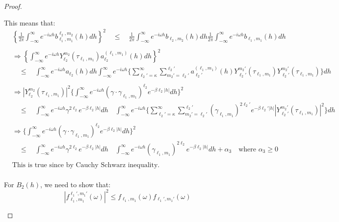 \documentclass[11pt]{article}
\begin{document}
\begin{itemize}
\begin{proof}
\begin{enumerate}
This means that:
\begin{align*}
&\left\{ \frac{1}{2\pi} \int_{-\infty}^\infty e^{-i\omega h} b_{\ell_1,m_1}^{\ell_2,m_2}(h) dh \right\}^2 \quad \le \quad \frac{1}{2\pi} \int_{-\infty}^\infty e^{-i\omega h} b_{\ell_2,m_2}(h) dh \frac{1}{2\pi} \int_{-\infty}^\infty e^{-i\omega h} b_{\ell_1,m_1}(h) dh \\
\\
&\Rightarrow \left\{ \int_{-\infty}^\infty e^{-i\omega h} Y_{\ell_2}^{m_2}(\tau_{\ell_1,m_1}) a_{\ell_2}^{(\ell_1,m_1)}(h) dh \right\}^2\\ 
&\quad \le \quad \int_{-\infty}^\infty e^{-i\omega h} a_{\ell_2}(h) dh \int_{-\infty}^\infty e^{-i\omega h} \biggl\{ \sum_{\ell_2'=\kappa}^{\infty} \sum_{m_2'=\ell_2'}^{\ell_2'} a_{\ell_2'}^{(\ell_1,m_1)}(h) Y_{\ell_2'}^{m_2'}(\tau_{\ell_1,m_1}) Y_{\ell_2'}^{m_2'}(\tau_{\ell_1,m_1}) \biggl\} dh\\
\\
&\Rightarrow |Y_{\ell_2}^{m_2}(\tau_{\ell_1,m_1})|^2 \biggl\{\int_{-\infty}^\infty e^{-i\omega h} (\gamma \cdot \gamma_{\ell_1,m_1})^{\ell_2} e^{-\beta \ell_2 |h|} dh \biggl\}^2\\
& \quad \le \quad \int_{-\infty}^\infty e^{-i\omega h} \gamma^{2\ell_2} e^{-\beta \ell_2 |h|}dh \quad \int_{-\infty}^\infty e^{-i\omega h} \biggl\{ \sum_{\ell_2'=\kappa}^{\infty} \sum_{m_2'=\ell_2'}^{\ell_2'} (\gamma_{\ell_1,m_1})^{2 \ell_2'} e^{-\beta \ell_2' |h|} |Y_{\ell_2'}^{m_2'}(\tau_{\ell_1,m_1})|^2\biggl\} dh\\
\\
&\Rightarrow \biggl\{\int_{-\infty}^\infty e^{-i\omega h} (\gamma \cdot \gamma_{\ell_1,m_1})^{\ell_2} e^{-\beta \ell_2 |h|} dh \biggl\}^2\\
& \quad \le \quad \int_{-\infty}^\infty e^{-i\omega h} \gamma^{2\ell_2} e^{-\beta \ell_2 |h|}dh \quad \int_{-\infty}^\infty e^{-i\omega h} (\gamma_{\ell_1,m_1})^{2 \ell_2} e^{-\beta \ell_2 |h|} dh + \alpha_3 \quad \text{where } \alpha_3 \ge 0\\\\
&\text{This is true since by Cauchy Schwarz inequality.}\\
\end{align*}

For $B_2(h)$, we need to show that:\\
$$|f_{\ell_1,m_1}^{\ell_1', m_1'}(\omega)|^2 \le f_{\ell_1,m_1}(\omega) f_{\ell_1',m_1'}(\omega)$$


\end{enumerate}
\end{proof}
\end{itemize}
\end{document}
